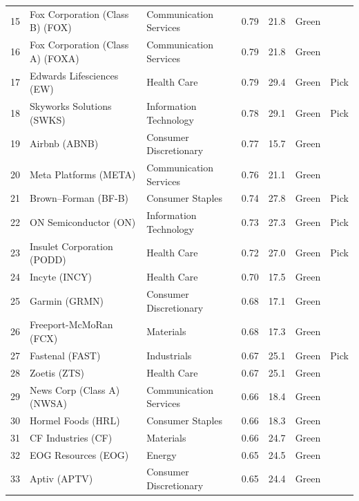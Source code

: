 \documentclass[11pt,a4paper]{article}
\begin{document}
{\begin{longtable}{r p{4.4cm} p{2.8cm} r r l l}
15 & Fox Corporation (Class B) (FOX) & Communication Services & 0.79 & 21.8 & \cellcolor[HTML]{C6EFCE}Green &  \\
16 & Fox Corporation (Class A) (FOXA) & Communication Services & 0.79 & 21.8 & \cellcolor[HTML]{C6EFCE}Green &  \\
17 & Edwards Lifesciences (EW) & Health Care & 0.79 & 29.4 & \cellcolor[HTML]{C6EFCE}Green & Pick \\
18 & Skyworks Solutions (SWKS) & Information Technology & 0.78 & 29.1 & \cellcolor[HTML]{C6EFCE}Green & Pick \\
19 & Airbnb (ABNB) & Consumer Discretionary & 0.77 & 15.7 & \cellcolor[HTML]{C6EFCE}Green &  \\
20 & Meta Platforms (META) & Communication Services & 0.76 & 21.1 & \cellcolor[HTML]{C6EFCE}Green &  \\
21 & Brown–Forman (BF-B) & Consumer Staples & 0.74 & 27.8 & \cellcolor[HTML]{C6EFCE}Green & Pick \\
22 & ON Semiconductor (ON) & Information Technology & 0.73 & 27.3 & \cellcolor[HTML]{C6EFCE}Green & Pick \\
23 & Insulet Corporation (PODD) & Health Care & 0.72 & 27.0 & \cellcolor[HTML]{C6EFCE}Green & Pick \\
24 & Incyte (INCY) & Health Care & 0.70 & 17.5 & \cellcolor[HTML]{C6EFCE}Green &  \\
25 & Garmin (GRMN) & Consumer Discretionary & 0.68 & 17.1 & \cellcolor[HTML]{C6EFCE}Green &  \\
26 & Freeport-McMoRan (FCX) & Materials & 0.68 & 17.3 & \cellcolor[HTML]{C6EFCE}Green &  \\
27 & Fastenal (FAST) & Industrials & 0.67 & 25.1 & \cellcolor[HTML]{C6EFCE}Green & Pick \\
28 & Zoetis (ZTS) & Health Care & 0.67 & 25.1 & \cellcolor[HTML]{C6EFCE}Green &  \\
29 & News Corp (Class A) (NWSA) & Communication Services & 0.66 & 18.4 & \cellcolor[HTML]{C6EFCE}Green &  \\
30 & Hormel Foods (HRL) & Consumer Staples & 0.66 & 18.3 & \cellcolor[HTML]{C6EFCE}Green &  \\
31 & CF Industries (CF) & Materials & 0.66 & 24.7 & \cellcolor[HTML]{C6EFCE}Green &  \\
32 & EOG Resources (EOG) & Energy & 0.65 & 24.5 & \cellcolor[HTML]{C6EFCE}Green &  \\
33 & Aptiv (APTV) & Consumer Discretionary & 0.65 & 24.4 & \cellcolor[HTML]{C6EFCE}Green &  \\

\end{longtable}}
\end{document}
